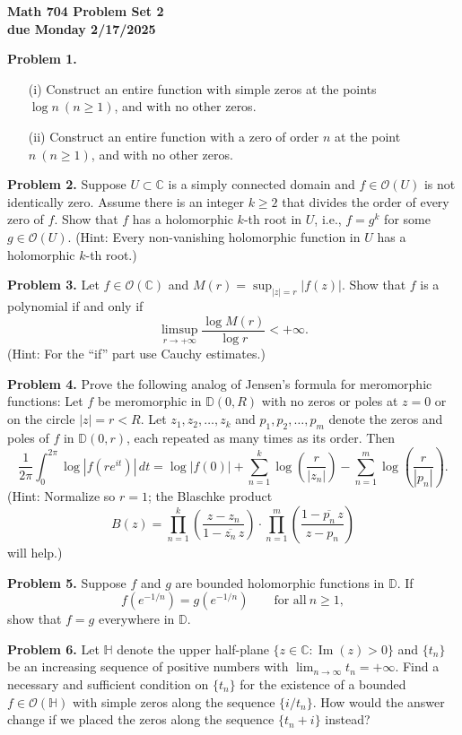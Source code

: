 \documentclass[12pt]{amsart}
\newcommand{\myim}{\operatorname{Im}}
\newcommand{\ov}{\overline}
\newcommand{\OO}{{\mathcal O}}
\newcommand{\CC}{{\mathbb C}}
\newcommand{\HH}{{\mathbb H}}
\newcommand{\DD}{{\mathbb D}}
\newcommand{\vs}{\vspace{2mm}}
\begin{document}
\begin{center}
{\bf \large Math 704 Problem Set 2} \vs \\
{\bf due Monday 2/17/2025} \vs \vs
\end{center}

\noindent
{\bf Problem 1.} 
\begin{enumerate}
\item[(i)]
Construct an entire function with simple zeros at the points $\log n \ (n \geq 1)$, and with no other zeros. \vs
\item[(ii)] 
Construct an entire function with a zero of order $n$ at the point $n \ (n \geq 1)$, and with no other zeros. 
\vs 
\end{enumerate}

\noindent
{\bf Problem 2.} Suppose $U \subset \CC$ is a simply connected domain and $f \in \OO(U)$ is not identically zero. Assume there is an integer $k \geq 2$ that divides the order of every zero of $f$. Show that $f$ has a holomorphic $k$-th root in $U$, i.e., $f=g^k$ for some $g \in \OO(U)$. (Hint: Every non-vanishing holomorphic function in $U$ has a holomorphic $k$-th root.) \vs 

\noindent
{\bf Problem 3.} Let $f \in \OO(\CC)$ and $M(r)=\sup_{|z|=r} |f(z)|$. Show that $f$ is a polynomial if and only if 
$$
\limsup_{r \to +\infty} \frac{\log M(r)}{\log r} < + \infty. 
$$
(Hint: For the ``if'' part use Cauchy estimates.) \vs 

\noindent
{\bf Problem 4.} Prove the following analog of Jensen's formula for meromorphic functions: Let $f$ be meromorphic in $\DD(0,R)$ with no zeros or poles at $z=0$ or on the circle $|z|=r<R$. Let $z_1, z_2, \ldots, z_k$ and $p_1, p_2, \ldots, p_m$ denote the zeros and poles of $f$ in $\DD(0,r)$, each repeated as many times as its order. Then
$$
\frac{1}{2\pi} \int_0^{2 \pi} \log |f(r e^{it})|\, dt = \log |f(0)| + \sum_{n=1}^k \log \left( \frac{r}{|z_n|} \right) - \sum_{n=1}^m \log \left( \frac{r}{|p_n|} \right).
$$
(Hint: Normalize so $r=1$; the Blaschke product
$$
B(z)=\prod_{n=1}^k \left( \frac{z-z_n}{1-\ov{z_n} \, z} \right) \cdot \prod_{n=1}^m
\left( \frac{1-\ov{p_n} \, z}{z-p_n} \right)
$$
will help.) \vs 

\noindent
{\bf Problem 5.} Suppose $f$ and $g$ are bounded holomorphic functions in $\DD$. If
$$
f(e^{-1/n})=g(e^{-1/n}) \qquad \text{for all} \ n \geq 1,
$$
show that $f=g$ everywhere in $\DD$. \vs

\noindent
{\bf Problem 6.} Let $\HH$ denote the upper half-plane $\{ z \in \CC: \myim(z)>0 \}$ and $\{ t_n \}$ be an increasing sequence of positive numbers with $\lim_{n \to \infty} t_n = +\infty$. Find a necessary and sufficient condition on $\{ t_n \}$ for the existence of a bounded $f \in \OO(\HH)$ with simple zeros along the sequence $\{ i/t_n \}$. How would the answer change if we placed the zeros along the sequence $\{ t_n + i \}$ instead? 
\end{document}
